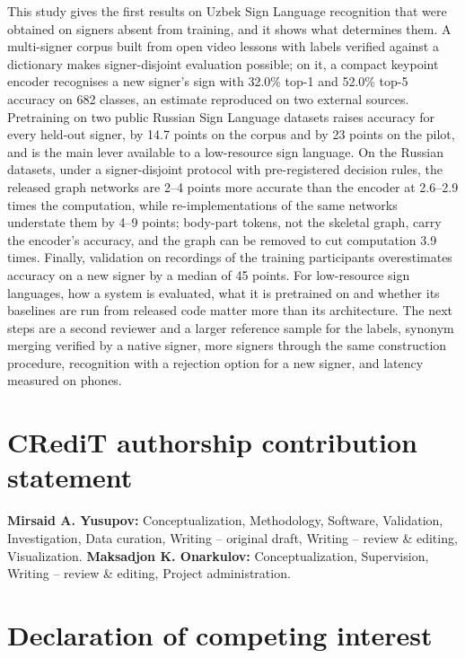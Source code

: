 \documentclass[a4paper,fleqn]{cas-dc}
\begin{document}
This study gives the first results on Uzbek Sign Language recognition that were obtained on signers absent from training, and it shows what determines them. A multi-signer corpus built from open video lessons with labels verified against a dictionary makes signer-disjoint evaluation possible; on it, a compact keypoint encoder recognises a new signer's sign with 32.0\% top-1 and 52.0\% top-5 accuracy on 682 classes, an estimate reproduced on two external sources. Pretraining on two public Russian Sign Language datasets raises accuracy for every held-out signer, by 14.7 points on the corpus and by 23 points on the pilot, and is the main lever available to a low-resource sign language. On the Russian datasets, under a signer-disjoint protocol with pre-registered decision rules, the released graph networks are 2--4 points more accurate than the encoder at 2.6--2.9 times the computation, while re-implementations of the same networks understate them by 4--9 points; body-part tokens, not the skeletal graph, carry the encoder's accuracy, and the graph can be removed to cut computation 3.9 times. Finally, validation on recordings of the training participants overestimates accuracy on a new signer by a median of 45 points. For low-resource sign languages, how a system is evaluated, what it is pretrained on and whether its baselines are run from released code matter more than its architecture. The next steps are a second reviewer and a larger reference sample for the labels, synonym merging verified by a native signer, more signers through the same construction procedure, recognition with a rejection option for a new signer, and latency measured on phones.

\hypertarget{credit-authorship-contribution-statement}{%
\section*{CRediT authorship contribution statement}\label{credit-authorship-contribution-statement}}

\textbf{Mirsaid A. Yusupov:} Conceptualization, Methodology, Software, Validation, Investigation, Data curation, Writing -- original draft, Writing -- review \& editing, Visualization. \textbf{Maksadjon K. Onarkulov:} Conceptualization, Supervision, Writing -- review \& editing, Project administration.

\hypertarget{declaration-of-competing-interest}{%
\section*{Declaration of competing interest}\label{declaration-of-competing-interest}}
\end{document}
